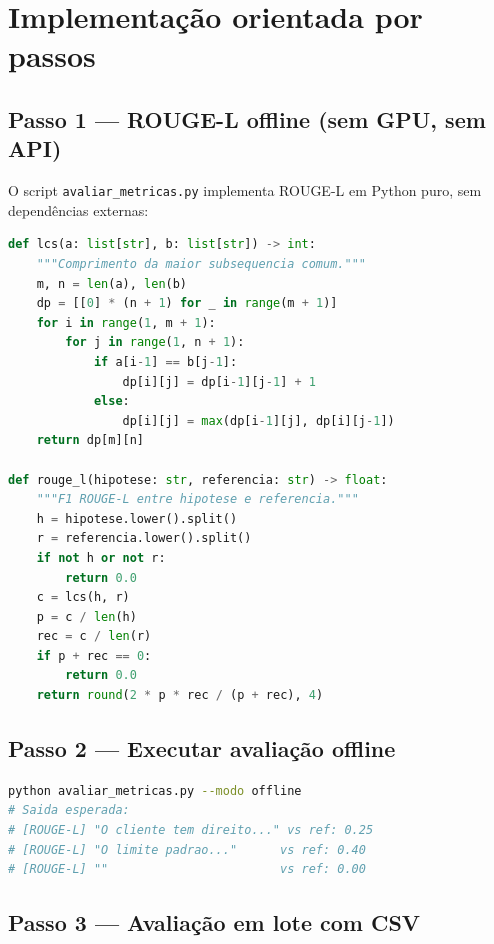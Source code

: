 \section{Implementa\c{c}\~ao orientada por passos}

\subsection{Passo 1 --- ROUGE-L offline (sem GPU, sem API)}

O script \texttt{avaliar\_metricas.py} implementa ROUGE-L em Python
puro, sem depend\^encias externas:

\begin{lstlisting}[language=Python,
  caption={ROUGE-L com LCS puro Python (\texttt{avaliar\_metricas.py}).},
  label={lst:rouge_l}]
def lcs(a: list[str], b: list[str]) -> int:
    """Comprimento da maior subsequencia comum."""
    m, n = len(a), len(b)
    dp = [[0] * (n + 1) for _ in range(m + 1)]
    for i in range(1, m + 1):
        for j in range(1, n + 1):
            if a[i-1] == b[j-1]:
                dp[i][j] = dp[i-1][j-1] + 1
            else:
                dp[i][j] = max(dp[i-1][j], dp[i][j-1])
    return dp[m][n]

def rouge_l(hipotese: str, referencia: str) -> float:
    """F1 ROUGE-L entre hipotese e referencia."""
    h = hipotese.lower().split()
    r = referencia.lower().split()
    if not h or not r:
        return 0.0
    c = lcs(h, r)
    p = c / len(h)
    rec = c / len(r)
    if p + rec == 0:
        return 0.0
    return round(2 * p * rec / (p + rec), 4)
\end{lstlisting}

\subsection{Passo 2 --- Executar avalia\c{c}\~ao offline}

\begin{lstlisting}[language=bash,
  caption={Demo offline de ROUGE-L.},
  label={lst:demo_offline}]
python avaliar_metricas.py --modo offline
# Saida esperada:
# [ROUGE-L] "O cliente tem direito..." vs ref: 0.25
# [ROUGE-L] "O limite padrao..."      vs ref: 0.40
# [ROUGE-L] ""                        vs ref: 0.00
\end{lstlisting}

\subsection{Passo 3 --- Avalia\c{c}\~ao em lote com CSV}

